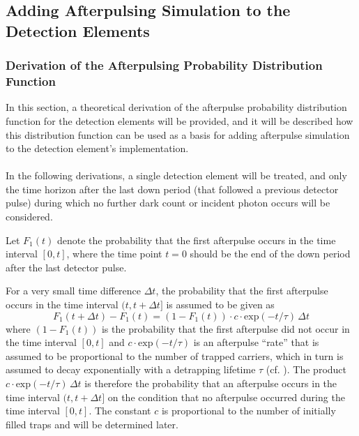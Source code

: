 \subsection{Adding Afterpulsing Simulation to the Detection Elements}
\label{subsec:after_pulsing}

\subsubsection{Derivation of the Afterpulsing Probability Distribution Function}

In this section, a theoretical derivation of the afterpulse probability distribution function for the detection elements will be provided, and it will be described how this distribution function can be used as a basis for adding afterpulse simulation to the detection element's implementation.\\
\\
In the following derivations, a single detection element will be treated, and only the time horizon after the last down period (that followed a previous detector pulse) during which no further dark count or incident photon occurs will be considered.  

Let $F_1(t)$ denote the probability that the first afterpulse occurs in the time interval $[0, t]$, where the time point $t = 0$ should be the end of the down period after the last detector pulse.

For a very small time difference $\Delta t$, the probability that the first afterpulse occurs in the time interval $(t, t + \Delta t]$ is assumed to be given as
\begin{equation}
\label{eq:f1start}
F_1(t+\Delta t)-F_1(t)=(1-F_1(t)) \cdot c \cdot \mathrm{exp}(-t/\tau)\,\Delta t
\end{equation}
where $(1-F_1(t))$ is the probability that the first afterpulse did not occur in the time interval $[0, t]$ and $c \cdot \mathrm{exp}(-t/\tau)$ is an afterpulse ``rate'' that is assumed to be proportional to the number of trapped carriers, which in turn is assumed to decay exponentially with a detrapping lifetime $\tau$ (cf. \cite[p.~2]{daSilva2011}). The product $c \cdot \mathrm{exp}(-t/\tau)\,\Delta t$ is therefore the probability that an afterpulse occurs in the time interval $(t, t + \Delta t]$ on the condition that no afterpulse occurred during the time interval $[0, t]$. The constant $c$ is proportional to the number of initially filled traps and will be determined later.

